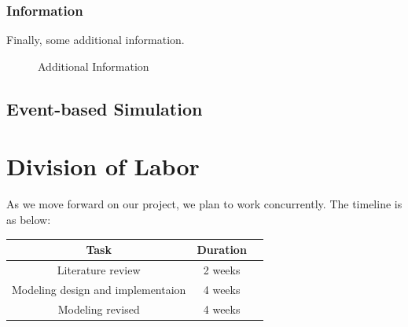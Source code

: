 \documentclass{article}
\begin{document}
\begin{normalsize}
\subsubsection{Information}
Finally, some additional information.
\begin{figure}[H]
	\caption{Additional Information}
\end{figure}

\subsection{Event-based Simulation}





		\section{Division of Labor}
		As we move forward on our project, we plan to work concurrently. The timeline is as below:
		
		\begin{center}
			\begin{tabular}{ |c|c|c| } 
				\hline
				Task & Duration  \\ 
				\hline
				Literature review & 2 weeks \\ 
				Modeling design and implementaion & 4 weeks \\ 
				Modeling revised & 4 weeks \\ 
				\hline
			\end{tabular}
		\end{center}
	

\end{normalsize}
\end{document}
